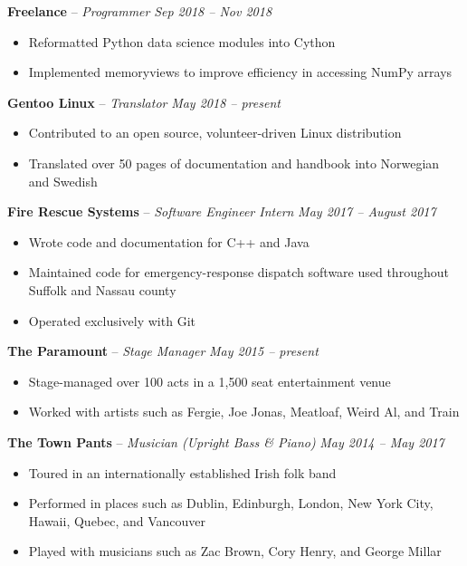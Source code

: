 \documentclass[11pt,letterpaper]{article}
\begin{document}
\headedsection
{\textbf{Freelance} -- \textit{Programmer}}
{\textit{Sep 2018 -- Nov 2018}} {
	\begin{itemize}[noitemsep,nolistsep]
		\item Reformatted Python data science modules into Cython
		\item Implemented memoryviews to improve efficiency in accessing NumPy arrays
	\end{itemize}
}


\headedsection
{\textbf{Gentoo Linux} -- \textit{Translator}}
{\textit{May 2018 -- present}} {
	\begin{itemize}[noitemsep,nolistsep]
		\item Contributed to an open source, volunteer-driven Linux distribution
		\item Translated over 50 pages of documentation and handbook into Norwegian and Swedish
	\end{itemize}
}



\headedsection 
{\textbf{Fire Rescue Systems} -- \textit{Software Engineer Intern}}
{\textit{May 2017 -- August 2017}} {
	\begin{itemize}[noitemsep,nolistsep]
		\item Wrote code and documentation for C++ and Java
		\item Maintained code for emergency-response dispatch software used throughout Suffolk and Nassau county
		\item Operated exclusively with Git 
	\end{itemize}
}


\headedsection 
{\textbf{The Paramount} -- \textit{Stage Manager}}
{\textit{May 2015 -- present}} {
	\begin{itemize}[noitemsep,nolistsep]
		\item Stage-managed over 100 acts in a 1,500 seat entertainment venue
		\item Worked with artists such as Fergie, Joe Jonas, Meatloaf, Weird Al, and Train
	\end{itemize}
}


\headedsection 
{\textbf{The Town Pants} -- \textit{Musician (Upright Bass \& Piano)}}
{\textit{May 2014 -- May 2017}} {
	\begin{itemize}[noitemsep,nolistsep]
		\item Toured in an internationally established Irish folk band
		\item Performed in places such as Dublin, Edinburgh, London, New York City, Hawaii, Quebec, and Vancouver
		\item Played with musicians such as Zac Brown, Cory Henry, and George Millar
	\end{itemize}
}
\end{document}
